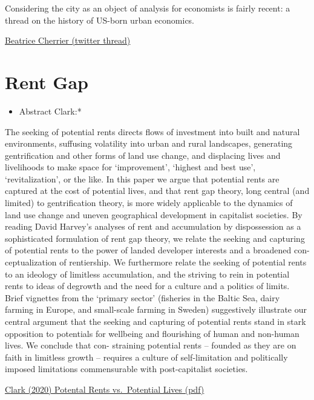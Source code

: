 \documentclass[
]{book}
\providecommand{\tightlist}{%
  \setlength{\itemsep}{0pt}\setlength{\parskip}{0pt}}
\begin{document}
Considering the city as an object of analysis for economists is fairly recent:
a thread on the history of US-born urban economics.

\href{https://twitter.com/Undercoverhist/status/1372999869204467718}{Beatrice Cherrier (twitter thread)}

\hypertarget{rent-gap}{%
\chapter{Rent Gap}\label{rent-gap}}

\begin{itemize}
\tightlist
\item
  Abstract Clark:*
\end{itemize}

The seeking of potential rents directs flows of investment into built and natural environments,
suffusing volatility into urban and rural landscapes, generating gentrification and other forms of
land use change, and displacing lives and livelihoods to make space for `improvement', `highest and
best use', `revitalization', or the like. In this paper we argue that potential rents are captured at
the cost of potential lives, and that rent gap theory, long central (and limited) to gentrification
theory, is more widely applicable to the dynamics of land use change and uneven geographical
development in capitalist societies. By reading David Harvey's analyses of rent and accumulation
by dispossession as a sophisticated formulation of rent gap theory, we relate the seeking and
capturing of potential rents to the power of landed developer interests and a broadened con-
ceptualization of rentiership. We furthermore relate the seeking of potential rents to an ideology
of limitless accumulation, and the striving to rein in potential rents to ideas of degrowth and the
need for a culture and a politics of limits. Brief vignettes from the `primary sector' (fisheries in the
Baltic Sea, dairy farming in Europe, and small-scale farming in Sweden) suggestively illustrate our
central argument that the seeking and capturing of potential rents stand in stark opposition to
potentials for wellbeing and flourishing of human and non-human lives. We conclude that con-
straining potential rents -- founded as they are on faith in limitless growth -- requires a culture of
self-limitation and politically imposed limitations commensurable with post-capitalist societies.

\href{pdf/Clark_2020_Rent_Gap.pdf}{Clark (2020) Potental Rents vs.~Potential Lives (pdf)}
\end{document}
